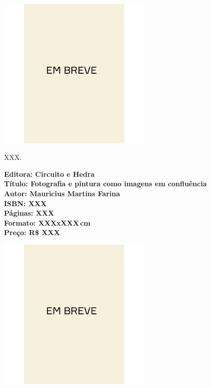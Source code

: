 \begin{center}
\hspace*{.5cm}\includegraphics[width=74mm]{./CAPAS/breve.jpeg}
\end{center}
\hspace*{-7cm}\hrulefill\hspace*{-7cm}
\medskip

\noindent{}XXX.

\vfill
\noindent\begin{minipage}[c]{1\linewidth}
{\small\textbf{
\hspace*{-.1cm}Editora: Circuito e Hedra\\
Título: Fotografia e pintura como imagens em confluência\\
Autor: Mauricius Martins Farina\\ 
ISBN: XXX\\
Páginas: XXX\\
Formato: XXXxXXX\,cm\\
Preço: R\$ XXX\\
}}
\end{minipage}
\pagebreak

\begin{center}
\hspace*{.5cm}\includegraphics[width=74mm]{./CAPAS/breve.jpeg}
\end{center}
\hspace*{-7cm}\hrulefill\hspace*{-7cm}
\medskip

